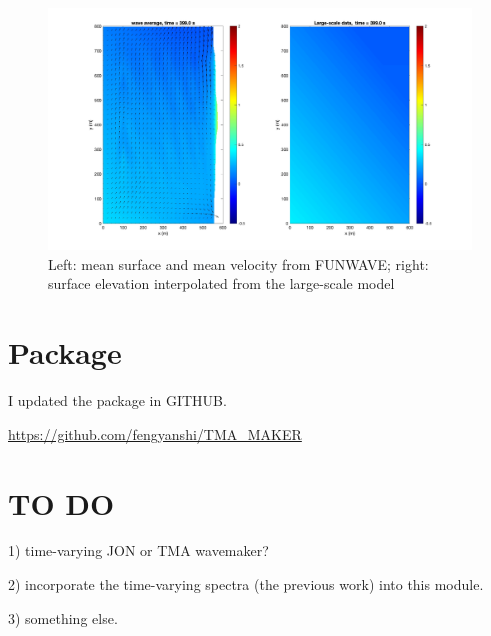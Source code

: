 \documentclass[preprint,10pt]{elsarticle}
\begin{document}
  \begin{figure}
\begin{center}
 \includegraphics[width=1.0\textwidth]{figures/uvmean_view.jpg}
 \caption{Left: mean surface and mean velocity from FUNWAVE; right: surface elevation interpolated from the large-scale model }
 \label{mean}
 \end{center}
 \end{figure}  
  
  \section{Package}
  
  I updated the package in GITHUB. 
  
    \href{https://github.com/fengyanshi/TMA_MAKER}{https://github.com/fengyanshi/TMA\_MAKER}
  
  \section{TO DO}
  
  1) time-varying JON or TMA wavemaker?
  
  2) incorporate the time-varying spectra (the previous work) into this module. 
  
  3) something else.
  
\end{document}
